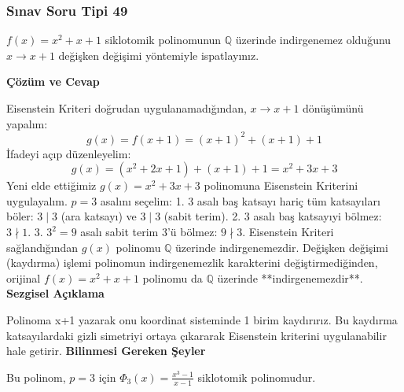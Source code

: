 \documentclass[11pt, a4paper]{article}
\newenvironment{cozum}{
    \vspace{0.5cm}
    \noindent\textcolor{green!60!black}{\faCheckCircle\enspace \textbf{\Large Çözüm ve Cevap}}\par\vspace{0.2cm}
}{}
\newenvironment{sezgisel}{
    \vspace{0.5cm}
    \noindent\textcolor{orange!80!black}{\faLightbulb\enspace \textbf{\Large Sezgisel Açıklama}}\par\vspace{0.2cm}
    \itshape
}{}
\newenvironment{bilgi}{
    \vspace{0.5cm}
    \noindent\textcolor{red!70!black}{\faExclamationTriangle\enspace \textbf{\Large Bilinmesi Gereken Şeyler}}\par\vspace{0.2cm}
}{}
\begin{document}
\subsubsection{Sınav Soru Tipi 49}
\begin{sinavbox}
$f(x) = x^2+x+1$ siklotomik polinomunun $\mathbb{Q}$ üzerinde indirgenemez olduğunu $x \to x+1$ değişken değişimi yöntemiyle ispatlayınız.
\end{sinavbox}
\begin{cozum}
Eisenstein Kriteri doğrudan uygulanamadığından, $x \to x+1$ dönüşümünü yapalım:
\[ g(x) = f(x+1) = (x+1)^2 + (x+1) + 1 \]
İfadeyi açıp düzenleyelim:
\[ g(x) = (x^2 + 2x + 1) + (x + 1) + 1 = x^2 + 3x + 3 \]
Yeni elde ettiğimiz $g(x) = x^2 + 3x + 3$ polinomuna Eisenstein Kriterini uygulayalım.
$p = 3$ asalını seçelim:
1. $3$ asalı baş katsayı hariç tüm katsayıları böler: $3 \mid 3$ (ara katsayı) ve $3 \mid 3$ (sabit terim).
2. $3$ asalı baş katsayıyi bölmez: $3 \nmid 1$.
3. $3^2 = 9$ asalı sabit terim $3$'ü bölmez: $9 \nmid 3$.
Eisenstein Kriteri sağlandığından $g(x)$ polinomu $\mathbb{Q}$ üzerinde indirgenemezdir.
Değişken değişimi (kaydırma) işlemi polinomun indirgenemezlik karakterini değiştirmediğinden, orijinal $f(x) = x^2+x+1$ polinomu da $\mathbb{Q}$ üzerinde **indirgenemezdir**.
\end{cozum}
\begin{sezgisel}
Polinoma x+1 yazarak onu koordinat sisteminde 1 birim kaydırırız. Bu kaydırma katsayılardaki gizli simetriyi ortaya çıkararak Eisenstein kriterini uygulanabilir hale getirir.
\end{sezgisel}
\begin{bilgi}
Bu polinom, $p=3$ için $\Phi_3(x) = \frac{x^3-1}{x-1}$ siklotomik polinomudur.
\end{bilgi}

\newpage
\end{document}
